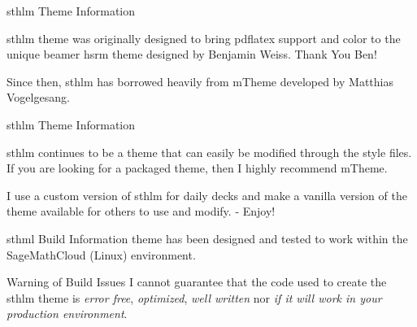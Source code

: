 \documentclass[newPxFont,numfooter,sectionpages]{beamer}
\begin{document}
\begin{frame}[c]{sthlm Theme Information}

\alert{sthlm} theme was originally designed to bring pdflatex support and color to the unique beamer \alert{hsrm} theme designed by Benjamin Weiss.  Thank You Ben!   

\begin{center}
\end{center}

Since then, \alert{sthlm} has borrowed heavily from \alert{mTheme} developed by Matthias Vogelgesang.  

\end{frame}



\begin{frame}[c]{sthlm Theme Information}
	
\alert{sthlm} continues to be a theme that can easily be modified through the style files.  If you are looking for a packaged theme, then I highly recommend \alert{mTheme}.\\

\vspace{1em}

I use a custom version of \alert{sthlm} for daily decks and make a vanilla version of the theme available for others to use and modify. - Enjoy!

\end{frame}


\begin{frame}[c]{sthml Build Information}
 theme has been designed and tested to work within the SageMathCloud (Linux) environment.\\

\vspace{1em}

\begin{alertblock}{Warning of Build Issues}
I cannot guarantee that the code used to create the sthlm theme is \emph{error free}, \emph{optimized}, \emph{well written} nor \emph{if it will work in your production environment}.
\end{alertblock}


\end{frame}
\end{document}
